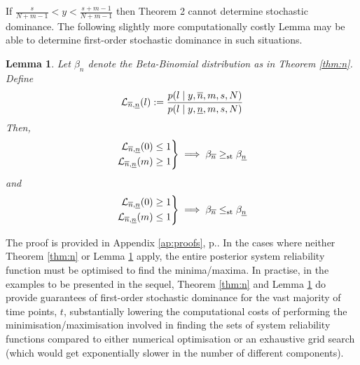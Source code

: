 \documentclass[12pt, a4paper]{elsarticle}
\newtheorem{lemma}[theorem]{Lemma}
\begin{document}
If $\frac{s}{N + m - 1} < y < \frac{s + m - 1}{N + m - 1}$ then 
Theorem 2 cannot determine stochastic dominance.  The following slightly
more computationally costly Lemma may be able to determine first-order
stochastic dominance in such situations.
\begin{lemma}
  \label{lem:n}
  Let $\beta_n$ denote the Beta-Binomial distribution as in Theorem \ref{thm:n}.  Define
  \[ \mathcal{L}_{\overline{n},\underline{n}}(l) := \frac{p(l \mid y, \overline{n}, m, s, N)}{p(l \mid y, \underline{n}, m, s, N)} \]
  Then,
  \[ \left. \begin{aligned}
       \mathcal{L}_{\overline{n},\underline{n}}(0) \le 1 \\
       \mathcal{L}_{\overline{n},\underline{n}}(m) \ge 1 \\
    \end{aligned} \right\}
    \implies \beta_{\overline{n}} \ge_{\mathrm{st}} \beta_{\underline{n}} \]
  and
  \[ \left. \begin{aligned}
       \mathcal{L}_{\overline{n},\underline{n}}(0) \ge 1 \\
       \mathcal{L}_{\overline{n},\underline{n}}(m) \le 1 \\
    \end{aligned} \right\}
    \implies \beta_{\overline{n}} \le_{\mathrm{st}} \beta_{\underline{n}} \]
\end{lemma}
The proof is provided in Appendix \ref{ap:proofs}, p.\pageref{prf:n2}.
In the cases where neither Theorem \ref{thm:n} or Lemma \ref{lem:n} apply,
the entire posterior system reliability function must be optimised to 
find the minima/maxima.
In practise, in the examples to be presented in the sequel, Theorem 
\ref{thm:n} and Lemma \ref{lem:n} do provide guarantees of first-order
stochastic dominance for the vast majority of time points, $t$,
substantially lowering the computational costs of performing the
minimisation/maximisation involved in finding the sets of system 
reliability functions compared to either numerical optimisation or
an exhaustive grid search (which would get exponentially slower in 
the number of different components).
\end{document}
